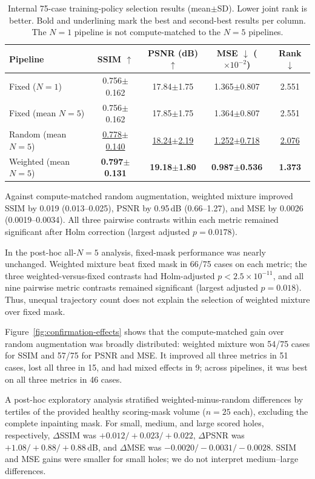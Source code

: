 \documentclass[runningheads]{llncs}
\begin{document}
\begin{table}[t]
  \centering
  \caption{Internal 75-case training-policy selection results (mean$\pm$SD). Lower joint rank is better. Bold and underlining mark the best and second-best results per column. The $N=1$ pipeline is not compute-matched to the $N=5$ pipelines.}
  \label{tab:model-selection-results}
  \small
  \setlength{\tabcolsep}{2.0pt}
  \begin{tabularx}{\textwidth}{@{}Xcccc@{}}
    \toprule
    Pipeline & SSIM $\uparrow$ & PSNR (dB) $\uparrow$ & MSE $\downarrow$ ($\times10^{-2}$) & Rank $\downarrow$ \\
    \midrule
    Fixed ($N=1$) & 0.756$\pm$0.162 & 17.84$\pm$1.75 & 1.365$\pm$0.807 & 2.551 \\
    Fixed (mean $N=5$) & 0.756$\pm$0.162 & 17.85$\pm$1.75 & 1.364$\pm$0.807 & 2.551 \\
    Random (mean $N=5$) & \underline{0.778$\pm$0.140} & \underline{18.24$\pm$2.19} & \underline{1.252$\pm$0.718} & \underline{2.076} \\
    Weighted (mean $N=5$) & \textbf{0.797$\pm$0.131} & \textbf{19.18$\pm$1.80} & \textbf{0.987$\pm$0.536} & \textbf{1.373} \\
    \bottomrule
  \end{tabularx}
\end{table}

Against compute-matched random augmentation, weighted mixture improved SSIM by 0.019 (0.013--0.025), PSNR by 0.95\,dB (0.66--1.27), and MSE by 0.0026 (0.0019--0.0034). All three pairwise contrasts within each metric remained significant after Holm correction (largest adjusted $p=0.0178$).

In the post-hoc all-$N=5$ analysis, fixed-mask performance was nearly unchanged. Weighted mixture beat fixed mask in 66/75 cases on each metric; the three weighted-versus-fixed contrasts had Holm-adjusted $p<2.5\times10^{-11}$, and all nine pairwise metric contrasts remained significant (largest adjusted $p=0.018$). Thus, unequal trajectory count does not explain the selection of weighted mixture over fixed mask.

Figure~\ref{fig:confirmation-effects} shows that the compute-matched gain over random augmentation was broadly distributed: weighted mixture won 54/75 cases for SSIM and 57/75 for PSNR and MSE. It improved all three metrics in 51 cases, lost all three in 15, and had mixed effects in 9; across pipelines, it was best on all three metrics in 46 cases.

A post-hoc exploratory analysis stratified weighted-minus-random differences by tertiles of the provided healthy scoring-mask volume ($n=25$ each), excluding the complete inpainting mask. For small, medium, and large scored holes, respectively, $\Delta$SSIM was $+0.012/ +0.023/ +0.022$, $\Delta$PSNR was $+1.08/ +0.88/ +0.88$\,dB, and $\Delta$MSE was $-0.0020/ -0.0031/ -0.0028$. SSIM and MSE gains were smaller for small holes; we do not interpret medium--large differences.
\end{document}
